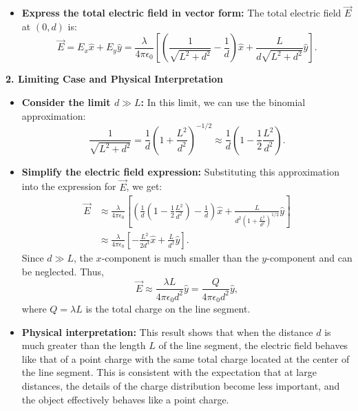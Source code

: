 \documentclass{article}
\begin{document}
\begin{itemize}
\item \textbf{Express the total electric field in vector form:} The total electric field \(\vec{E}\) at \((0, d)\) is:
    \begin{equation*}
    \vec{E} = E_x \hat{x} + E_y \hat{y} = \frac{\lambda}{4\pi\epsilon_0} \left[ \left( \frac{1}{\sqrt{L^2 + d^2}} - \frac{1}{d} \right) \hat{x} + \frac{L}{d \sqrt{L^2 + d^2}} \hat{y} \right].
    \end{equation*}
\end{itemize}

\textbf{2. Limiting Case and Physical Interpretation}

\begin{itemize}
\item \textbf{Consider the limit \(d \gg L\):} In this limit, we can use the binomial approximation:
    \begin{equation*}
    \frac{1}{\sqrt{L^2 + d^2}} = \frac{1}{d} \left( 1 + \frac{L^2}{d^2} \right)^{-1/2} \approx \frac{1}{d} \left( 1 - \frac{1}{2} \frac{L^2}{d^2} \right).
    \end{equation*}

\item \textbf{Simplify the electric field expression:} Substituting this approximation into the expression for \(\vec{E}\), we get:
    \begin{align*}
    \vec{E} &\approx \frac{\lambda}{4\pi\epsilon_0} \left[ \left( \frac{1}{d} \left( 1 - \frac{1}{2} \frac{L^2}{d^2} \right) - \frac{1}{d} \right) \hat{x} + \frac{L}{d^2 \left( 1 + \frac{L^2}{d^2} \right)^{1/2}} \hat{y} \right] \\
    &\approx \frac{\lambda}{4\pi\epsilon_0} \left[ -\frac{L^2}{2d^3} \hat{x} + \frac{L}{d^2} \hat{y} \right].
    \end{align*}
    Since \(d \gg L\), the \(x\)-component is much smaller than the \(y\)-component and can be neglected. Thus,
    \begin{equation*}
    \vec{E} \approx \frac{\lambda L}{4\pi\epsilon_0 d^2} \hat{y} = \frac{Q}{4\pi\epsilon_0 d^2} \hat{y},
    \end{equation*}
    where \(Q = \lambda L\) is the total charge on the line segment.

\item \textbf{Physical interpretation:} This result shows that when the distance \(d\) is much greater than the length \(L\) of the line segment, the electric field behaves like that of a point charge with the same total charge located at the center of the line segment. This is consistent with the expectation that at large distances, the details of the charge distribution become less important, and the object effectively behaves like a point charge.
\end{itemize}
\end{document}

